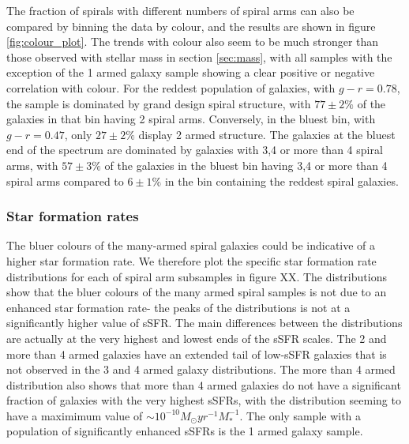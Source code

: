 \documentclass[useAMS,usenatbib]{mn2e}
\begin{document}
The fraction of spirals with different numbers of spiral arms can also be compared by binning the data by colour, and the results are shown in figure \ref{fig:colour_plot}. The trends with colour also seem to be much stronger than those observed with stellar mass in section \ref{sec:mass}, with all  samples with the exception of the 1 armed galaxy sample showing a clear positive or negative correlation with colour. For the reddest population of galaxies, with $g-r=0.78$, the sample is dominated by grand design spiral structure, with $77 \pm 2 \%$ of the galaxies in that bin having 2 spiral arms. Conversely, in the bluest bin, with $g-r=0.47$, only $27 \pm 2 \%$ display 2 armed structure. The galaxies at the bluest end of the spectrum are dominated by galaxies with 3,4 or more than 4 spiral arms, with $57 \pm 3 \%$ of the galaxies in the bluest bin having 3,4 or more than 4 spiral arms compared to $6 \pm 1 \%$ in the bin containing the reddest spiral galaxies. 


\subsubsection{Star formation rates}
\label{sec:SFR}

The bluer colours of the many-armed spiral galaxies could be indicative of a higher star formation rate. We therefore plot the specific star formation rate distributions for each of spiral arm subsamples in figure XX. The distributions show that the bluer colours of the many armed spiral samples is not due to an enhanced star formation rate- the peaks of the distributions is not at a significantly higher value of sSFR. The main differences between the distributions are actually at the very highest and lowest ends of the sSFR scales. The 2 and more than 4 armed galaxies have an extended tail of low-sSFR galaxies that is not observed in the 3 and 4 armed galaxy distributions. The more than 4 armed distribution also shows that more than 4 armed galaxies do not have a significant fraction of galaxies with the very highest sSFRs, with the distribution seeming to have a maximimum value of $\sim 10^{-10} M_{\odot} yr^{-1}M_*^{-1}$. The only sample with a population of significantly enhanced sSFRs is the 1 armed galaxy sample. 
\end{document}
